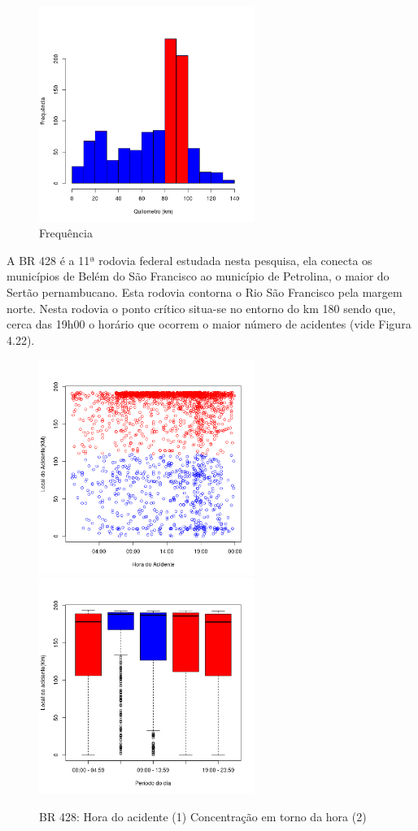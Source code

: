\quad \quad
\begin{figure}[h]
	\centering
	\caption{ Frequência}
	\includegraphics[width=7cm,height=7cm]{Figuras/Preprocess/br424_3.png}
\end{figure}


\pagebreak

A BR 428 é a 11ª rodovia federal estudada nesta pesquisa, ela conecta os municípios de Belém do São Francisco ao município de Petrolina, o maior do Sertão pernambucano. Esta rodovia contorna o Rio São Francisco pela margem norte. Nesta rodovia o ponto crítico situa-se no entorno do km 180 sendo que, cerca das 19h00 o horário que ocorrem o maior número de acidentes (vide Figura 4.22).  

\begin{figure}[h]
	\caption{BR 428: Hora do acidente (1) Concentração em torno da hora (2)}
	\includegraphics[width=7cm,height=7cm]{Figuras/Preprocess/br428_1.png}
	\includegraphics[width=7cm,height=7cm]{Figuras/Preprocess/br428_2.png}
	
\end{figure}

